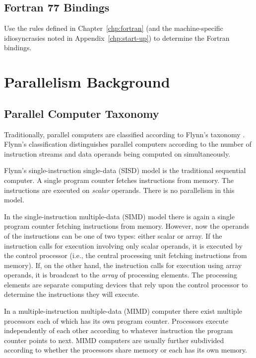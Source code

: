 \documentclass{report}
\begin{document}
\section*{Fortran 77 Bindings}\label{app:bindings-fortran}

Use the rules defined in Chapter~\ref{chp:fortran} (and the machine-specific
idiosyncrasies noted in Appendix~\ref{chp:start-up}) to determine the Fortran
bindings.

\chapter{Parallelism Background}\label{app:par-background}

\section*{Parallel Computer Taxonomy}

Traditionally, parallel computers are classified according to Flynn's
taxonomy \cite{Fl72}.  Flynn's classification distinguishes parallel computers
according to the number of instruction streams and data operands being
computed on simultaneously.  

Flynn's single-instruction single-data (SISD) model is the traditional
sequential computer.  A single program counter fetches instructions from
memory.  The instructions are executed on {\em scalar} operands.  There is no
parallelism in this model.

In the single-instruction multiple-data (SIMD) model there is again a single
program counter fetching instructions from memory.  However, now the operands
of the instructions can be one of two types: either scalar or array.  If the
instruction calls for execution involving only scalar operands, it is executed
by the control processor (i.e., the central processing unit fetching
instructions from memory).  If, on the other hand, the instruction calls for
execution using array operands, it is broadcast to the {\em array} of
processing elements.  The processing elements are separate computing devices
that rely upon the control processor to determine the instructions they will
execute.

In a multiple-instruction multiple-data (MIMD) computer there exist multiple
processors each of which has its own program counter.  Processors execute
independently of each other according to whatever instruction the program
counter points to next.  MIMD computers are usually further subdivided
according to whether the processors share memory or each has its own memory.
\end{document}
